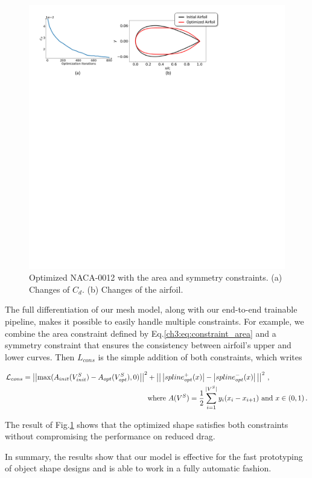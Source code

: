 \begin{figure}[!htbp]
    \begin{center}
    \includegraphics[width=0.9\linewidth]{chapter3/tex/figures/experiment/shape_optimization_case_2_constraints.pdf}
    \end{center}
    \caption{ \small
		Optimized NACA-0012 with the area and symmetry constraints. (a) Changes of $C_d$. (b) Changes of the airfoil.
    }   
    \label{ch3:fig:exp_optim_2_constraints}
\end{figure}

The full differentiation of our mesh model, along with our  end-to-end trainable pipeline, makes it possible to easily handle multiple constraints. For example, we combine the area constraint defined by Eq.\ref{ch3:eq:constraint_area} and a symmetry constraint that ensures the consistency between airfoil's upper and lower curves. Then $L_{cons}$ is the simple addition of both constraints, which writes

\begin{align}
    \begin{split}
        {\mathcal{L}_{cons}} = \left|\left|\max (A_{init}(V_{init}^S) - A_{opt}(V_{opt}^S),0)\right|\right|^2 &+{\left|\left|\,\left|spline_{opt}^ + (x)\right| - \left|spline_{opt}^ - (x)\right|\,\right|\right|^2}\,\,,\\
        &\text{where}\,\,A({V^S}) = \frac{1}{2}\sum\limits_{i = 1}^{|{V^S}|} {{y_i}({x_i} - {x_{i + 1}})} \,\,\text{and}\,\, x\in(0,1)\,.
    \end{split}
\end{align}

The result of Fig.\ref{ch3:fig:exp_optim_2_constraints} shows that the optimized shape satisfies both constraints without compromising the performance on reduced drag.

In summary, the results show that our model is effective for the fast prototyping of object shape designs and is able to work in a fully automatic fashion.